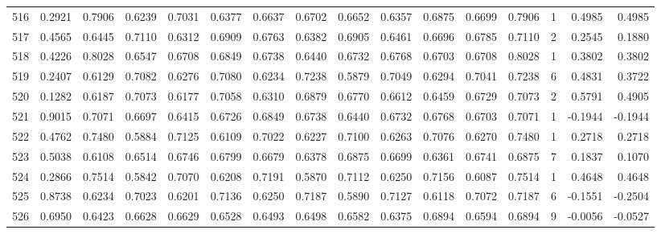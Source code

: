 \begin{tabular}{lrrrrrrrrrrrrrrr}
516 &      0.2921 &  0.7906 &  0.6239 &  0.7031 &  0.6377 &  0.6637 &  0.6702 &  0.6652 &  0.6357 &  0.6875 &   0.6699 &     0.7906 &      1 &                    0.4985 &                     0.4985 \\
517 &      0.4565 &  0.6445 &  0.7110 &  0.6312 &  0.6909 &  0.6763 &  0.6382 &  0.6905 &  0.6461 &  0.6696 &   0.6785 &     0.7110 &      2 &                    0.2545 &                     0.1880 \\
518 &      0.4226 &  0.8028 &  0.6547 &  0.6708 &  0.6849 &  0.6738 &  0.6440 &  0.6732 &  0.6768 &  0.6703 &   0.6708 &     0.8028 &      1 &                    0.3802 &                     0.3802 \\
519 &      0.2407 &  0.6129 &  0.7082 &  0.6276 &  0.7080 &  0.6234 &  0.7238 &  0.5879 &  0.7049 &  0.6294 &   0.7041 &     0.7238 &      6 &                    0.4831 &                     0.3722 \\
520 &      0.1282 &  0.6187 &  0.7073 &  0.6177 &  0.7058 &  0.6310 &  0.6879 &  0.6770 &  0.6612 &  0.6459 &   0.6729 &     0.7073 &      2 &                    0.5791 &                     0.4905 \\
521 &      0.9015 &  0.7071 &  0.6697 &  0.6415 &  0.6726 &  0.6849 &  0.6738 &  0.6440 &  0.6732 &  0.6768 &   0.6703 &     0.7071 &      1 &                   -0.1944 &                    -0.1944 \\
522 &      0.4762 &  0.7480 &  0.5884 &  0.7125 &  0.6109 &  0.7022 &  0.6227 &  0.7100 &  0.6263 &  0.7076 &   0.6270 &     0.7480 &      1 &                    0.2718 &                     0.2718 \\
523 &      0.5038 &  0.6108 &  0.6514 &  0.6746 &  0.6799 &  0.6679 &  0.6378 &  0.6875 &  0.6699 &  0.6361 &   0.6741 &     0.6875 &      7 &                    0.1837 &                     0.1070 \\
524 &      0.2866 &  0.7514 &  0.5842 &  0.7070 &  0.6208 &  0.7191 &  0.5870 &  0.7112 &  0.6250 &  0.7156 &   0.6087 &     0.7514 &      1 &                    0.4648 &                     0.4648 \\
525 &      0.8738 &  0.6234 &  0.7023 &  0.6201 &  0.7136 &  0.6250 &  0.7187 &  0.5890 &  0.7127 &  0.6118 &   0.7072 &     0.7187 &      6 &                   -0.1551 &                    -0.2504 \\
526 &      0.6950 &  0.6423 &  0.6628 &  0.6629 &  0.6528 &  0.6493 &  0.6498 &  0.6582 &  0.6375 &  0.6894 &   0.6594 &     0.6894 &      9 &                   -0.0056 &                    -0.0527 \\

\end{tabular}
